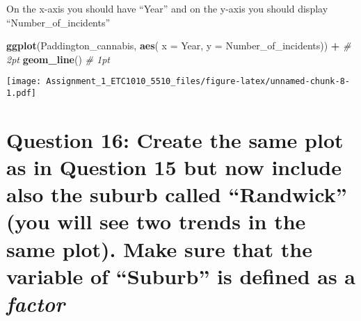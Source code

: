 \documentclass[
]{article}
\newenvironment{Shaded}{\begin{snugshade}}{\end{snugshade}}
\newcommand{\CommentTok}[1]{\textcolor[rgb]{0.56,0.35,0.01}{\textit{#1}}}
\newcommand{\DataTypeTok}[1]{\textcolor[rgb]{0.13,0.29,0.53}{#1}}
\newcommand{\KeywordTok}[1]{\textcolor[rgb]{0.13,0.29,0.53}{\textbf{#1}}}
\newcommand{\NormalTok}[1]{#1}
\newcommand{\OperatorTok}[1]{\textcolor[rgb]{0.81,0.36,0.00}{\textbf{#1}}}
\newcommand{\StringTok}[1]{\textcolor[rgb]{0.31,0.60,0.02}{#1}}
\begin{document}
On the x-axis you should have ``Year'' and on the y-axis you should
display ``Number\_of\_incidents''

\begin{Shaded}
\begin{Highlighting}[]
\KeywordTok{ggplot}\NormalTok{(Paddington_cannabis, }\KeywordTok{aes}\NormalTok{( }\DataTypeTok{x =}\NormalTok{ Year, }\DataTypeTok{y =}\NormalTok{ Number_of_incidents)) }\OperatorTok{+}\StringTok{ }\CommentTok{# 2pt }
\StringTok{  }\KeywordTok{geom_line}\NormalTok{()                     }\CommentTok{# 1pt}
\end{Highlighting}
\end{Shaded}

\texttt{[image: Assignment\_1\_ETC1010\_5510\_files/figure-latex/unnamed-chunk-8-1.pdf]}

\hypertarget{question-16-create-the-same-plot-as-in-question-15-but-now-include-also-the-suburb-called-randwick-you-will-see-two-trends-in-the-same-plot.-make-sure-that-the-variable-of-suburb-is-defined-as-a-factor}{%
\section{\texorpdfstring{Question 16: Create the same plot as in
Question 15 but now include also the suburb called ``Randwick'' (you
will see two trends in the same plot). Make sure that the variable of
``Suburb'' is defined as a
\emph{factor}}{Question 16: Create the same plot as in Question 15 but now include also the suburb called ``Randwick'' (you will see two trends in the same plot). Make sure that the variable of ``Suburb'' is defined as a factor}}\label{question-16-create-the-same-plot-as-in-question-15-but-now-include-also-the-suburb-called-randwick-you-will-see-two-trends-in-the-same-plot.-make-sure-that-the-variable-of-suburb-is-defined-as-a-factor}}
\end{document}
